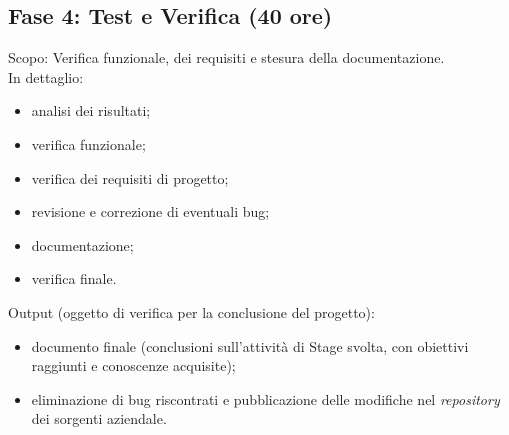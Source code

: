 \subsection{Fase 4: Test e Verifica (40 ore)}
Scopo: Verifica funzionale, dei requisiti e stesura della documentazione.\\
In dettaglio:
\begin{itemize}
	\item analisi dei risultati;
	\item verifica funzionale;
	\item verifica dei requisiti di progetto;
	\item revisione e correzione di eventuali bug;
	\item documentazione;
	\item verifica finale.
\end{itemize}
Output (oggetto di verifica per la conclusione del progetto):
\begin{itemize}
	\item documento finale (conclusioni sull'attività di Stage svolta, con obiettivi raggiunti e
conoscenze acquisite);
	\item eliminazione di bug riscontrati e pubblicazione delle modifiche nel \emph{repository} dei sorgenti aziendale.
\end{itemize}

